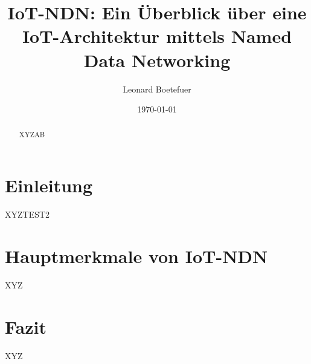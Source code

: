 \documentclass[a4paper,12pt]{article}
\title{IoT-NDN: Ein Überblick über eine IoT-Architektur mittels Named Data Networking}
\author{Leonard Boetefuer}
\date{\today}
\begin{document}
\maketitle

\begin{abstract}
XYZAB
\end{abstract}

\section{Einleitung}
XYZTEST2
\section{Hauptmerkmale von IoT-NDN}
XYZ
\section{Fazit}
XYZ
\end{document}

